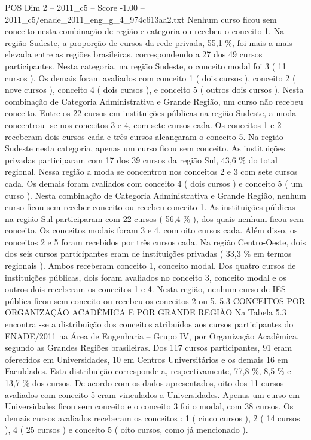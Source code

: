 \begin{textsample}{POS Dim 2 – 2011\_c5 – Score -1.00 – 2011\_c5/enade\_2011\_eng\_g\_4\_974c613aa2.txt}
Nenhum curso ficou sem conceito nesta combinação de região e categoria ou recebeu o conceito 1.
Na região Sudeste, a proporção de cursos da rede privada, 55,1 \%, foi mais a mais elevada entre as regiões brasileiras, correspondendo a 27 dos 49 cursos participantes.
Nesta categoria, na região Sudeste, o conceito modal foi 3 ( 11 cursos ).
Os demais foram avaliados com conceito 1 ( dois cursos ), conceito 2 ( nove cursos ), conceito 4 ( dois cursos ), e conceito 5 ( outros dois cursos ).
Nesta combinação de Categoria Administrativa e Grande Região, um curso não recebeu conceito.
Entre os 22 cursos em instituições públicas na região Sudeste, a moda concentrou -se nos conceitos 3 e 4, com sete cursos cada.
Os conceitos 1 e 2 receberam dois cursos cada e três cursos alcançaram o conceito 5.
Na região Sudeste nesta categoria, apenas um curso ficou sem conceito.
As instituições privadas participaram com 17 dos 39 cursos da região Sul, 43,6 \% do total regional.
Nessa região a moda se concentrou nos conceitos 2 e 3 com sete cursos cada.
Os demais foram avaliados com conceito 4 ( dois cursos ) e conceito 5 ( um curso ).
Nesta combinação de Categoria Administrativa e Grande Região, nenhum curso ficou sem receber conceito ou recebeu conceito 1.
As instituições públicas na região Sul participaram com 22 cursos ( 56,4 \% ), dos quais nenhum ficou sem conceito.
Os conceitos modais foram 3 e 4, com oito cursos cada.
Além disso, os conceitos 2 e 5 foram recebidos por três cursos cada.
Na região Centro-Oeste, dois dos seis cursos participantes eram de instituições privadas ( 33,3 \% em termos regionais ).
Ambos receberam conceito 1, conceito modal.
Dos quatro cursos de instituições públicas, dois foram avaliados no conceito 3, conceito modal e os outros dois receberam os conceitos 1 e 4.
Nesta região, nenhum curso de IES pública ficou sem conceito ou recebeu os conceitos 2 ou 5. 5.3 CONCEITOS POR ORGANIZAÇÃO ACADÊMICA E POR GRANDE REGIÃO Na Tabela 5.3 encontra -se a distribuição dos conceitos atribuídos aos cursos participantes do ENADE/2011 na Área de Engenharia – Grupo IV, por Organização Acadêmica, segundo as Grandes Regiões brasileiras.
Dos 117 cursos participantes, 91 eram oferecidos em Universidades, 10 em Centros Universitários e os demais 16 em Faculdades.
Esta distribuição corresponde a, respectivamente, 77,8 \%, 8,5 \% e 13,7 \% dos cursos.
De acordo com os dados apresentados, oito dos 11 cursos avaliados com conceito 5 eram vinculados a Universidades.
Apenas um curso em Universidades ficou sem conceito e o conceito 3 foi o modal, com 38 cursos.
Os demais cursos avaliados receberam os conceitos : 1 ( cinco cursos ), 2 ( 14 cursos ), 4 ( 25 cursos ) e conceito 5 ( oito cursos, como já mencionado ).

\end{textsample}
